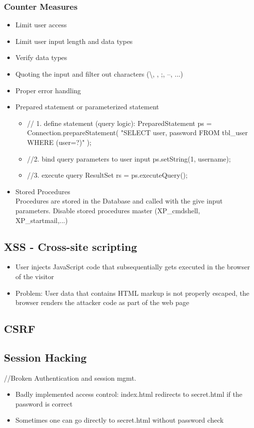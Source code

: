 \documentclass[a4paper, 12pt]{article}
\begin{document}
\subsubsection{Counter Measures}
\begin{itemize}
\item Limit user access
\item Limit user input length and data types
\item Verify data types
\item Quoting the input and filter out characters (\textbackslash, \textslash, ;, --, ...)
\item Proper error handling
\item Prepared statement or parameterized statement \\
\begin{itemize}
\item // 1. define statement (query logic):
PreparedStatement ps = Connection.prepareStatement(
"SELECT user, password FROM tbl_user WHERE (user=?)"
);
\item //2. bind query parameters to user input
ps.setString(1, username);
\item //3. execute query
ResultSet rs = ps.executeQuery();
\end{itemize}
\item Stored Procedures \\
Procedures are stored in the Database and called with the give input parameters.
Disable stored procedures master (XP_cmdshell, XP_startmail,...)
\end{itemize}

\subsection{XSS - Cross-site scripting}
\begin{itemize}
\item User injects JavaScript code that subsequentially gets executed in the browser of the visitor
\item Problem: User data that contains HTML markup is not properly escaped, the browser renders the attacker code as part of the web page
\end{itemize}

\subsection{CSRF}
\subsection{Session Hacking}
//Broken Authentication and session mgmt.
\begin{itemize}
\item Badly implemented access control: index.html redirects to secret.html if the password is correct
\item Sometimes one can go directly to secret.html without password check
\end{itemize}
\end{document}
